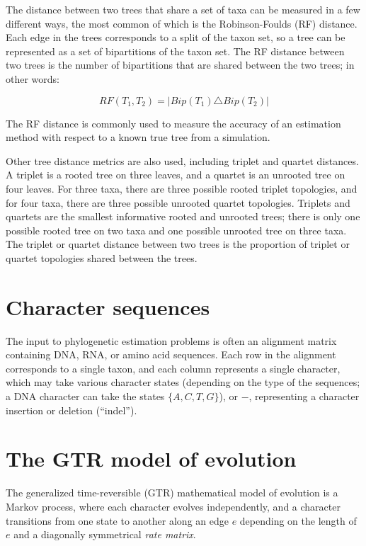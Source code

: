 \documentclass[edeposit,fullpage]{uiucthesis2014}
\theoremstyle{definition}
\begin{document}
The distance between two trees that share a set of taxa can be
measured in a few different ways, the most common of which is the
Robinson-Foulds (RF) distance. Each edge in the trees corresponds to a
split of the taxon set, so a tree can be represented as a set of
bipartitions of the taxon set. The RF distance between two trees is
the number of bipartitions that are shared between the two trees;
in other words:

\begin{equation}
  \label{eq:rfdistance}
  RF(T_1, T_2) = |Bip(T_1) \triangle Bip(T_2)|
\end{equation}


The RF distance is commonly used to measure the accuracy of an
estimation method with respect to a known true tree from a
simulation.

Other tree distance metrics are also used, including triplet and
quartet distances. A triplet is a rooted tree on three leaves, and a
quartet is an unrooted tree on four leaves. For three taxa, there are
three possible rooted triplet topologies, and for four taxa, there are
three possible unrooted quartet topologies. Triplets and quartets are
the smallest informative rooted and unrooted trees; there is only one
possible rooted tree on two taxa and one possible unrooted tree on
three taxa. The triplet or quartet distance between two trees is the
proportion of triplet or quartet topologies shared between the trees.

\section{Character sequences}

The input to phylogenetic estimation problems is often an alignment
matrix containing DNA, RNA, or amino acid sequences. Each row in the
alignment corresponds to a single taxon, and each column represents a
single character, which may take various character states (depending
on the type of the sequences; a DNA character can take the states
$\{A,C,T,G\}$), or $-$, representing a character insertion or deletion
(``indel'').

\section{The GTR model of evolution}
\label{section:simple-model}


The generalized time-reversible (GTR) mathematical model of evolution
is a Markov process, where each character evolves independently, and a
character transitions from one state to another along an edge $e$
depending on the length of $e$ and a diagonally symmetrical \emph{rate
  matrix}. 
\end{document}

